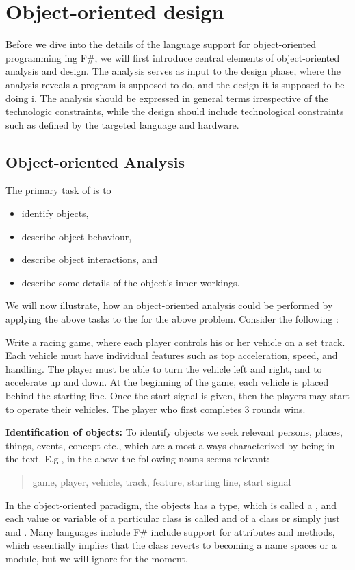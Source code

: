 \documentclass[fsharpnotes.tex]{subfiles}
\begin{document}
\chapter{Object-oriented design}
\label{chap:ood}

Before we dive into the details of the language support for object-oriented programming ing F\#, we will first introduce central elements of object-oriented analysis and design. The analysis serves as input to the design phase, where the analysis reveals  a program is supposed to do, and the design  it is supposed to be doing i. The analysis should be expressed in general terms irrespective of the technologic constraints, while the design should include technological constraints such as defined by the targeted language and hardware. 

\section{Object-oriented Analysis}
The primary task of  is to 
\begin{itemize}
\item identify objects,
\item describe object behaviour,
\item describe object interactions, and 
\item describe some details of the object's inner workings.
\end{itemize}
We will now illustrate, how an object-oriented analysis could be performed by applying the above tasks to the for the above problem. Consider the following :
%
\begin{problem}
  Write a racing game, where each player controls his or her vehicle on a set track. Each vehicle must have individual features such as top acceleration, speed, and handling. The player must be able to turn the vehicle left and right, and to accelerate up and down. At the beginning of the game, each vehicle is placed behind the starting line. Once the start signal is given, then the players may start to operate their vehicles. The player who first completes 3 rounds wins.
\end{problem}
%
\textbf{Identification of objects:} To identify objects we seek relevant persons, places, things, events, concept etc., which are almost always characterized by being  in the text. E.g., in the above the following nouns seems relevant: 
\begin{quote}
  game, player, vehicle, track, feature, starting line, start signal
\end{quote}
In the object-oriented paradigm, the objects has a type, which is called a , and each value or variable of a particular class is called and  of a class or simply just and . Many languages include F\# include support for  attributes and methods, which essentially implies that the class reverts to becoming a name spaces or a module, but we will ignore for the moment. 
\end{document}
